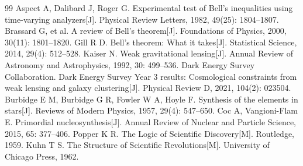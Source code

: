 \documentclass[12pt,a4paper]{ctexart}
\begin{document}
\begin{thebibliography}{99}
 Aspect A, Dalibard J, Roger G. Experimental test of Bell's inequalities using time-varying analyzers[J]. Physical Review Letters, 1982, 49(25): 1804–1807.
 Brassard G, et al. A review of Bell's theorem[J]. Foundations of Physics, 2000, 30(11): 1801–1820.
 Gill R D. Bell's theorem: What it takes[J]. Statistical Science, 2014, 29(4): 512–528.
 Kaiser N. Weak gravitational lensing[J]. Annual Review of Astronomy and Astrophysics, 1992, 30: 499–536.
 Dark Energy Survey Collaboration. Dark Energy Survey Year 3 results: Cosmological constraints from weak lensing and galaxy clustering[J]. Physical Review D, 2021, 104(2): 023504.
 Burbidge E M, Burbidge G R, Fowler W A, Hoyle F. Synthesis of the elements in stars[J]. Reviews of Modern Physics, 1957, 29(4): 547–650.
 Coc A, Vangioni-Flam E. Primordial nucleosynthesis[J]. Annual Review of Nuclear and Particle Science, 2015, 65: 377–406.
 Popper K R. The Logic of Scientific Discovery[M]. Routledge, 1959.
 Kuhn T S. The Structure of Scientific Revolutions[M]. University of Chicago Press, 1962.
\end{thebibliography}
\end{document}
